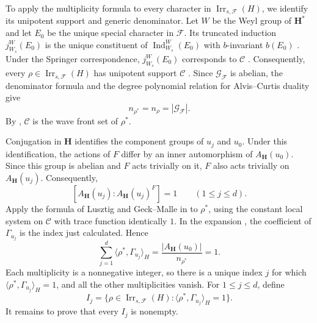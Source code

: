 \documentclass[10pt]{amsart}
\theoremstyle{definition}
\renewcommand{\leq}{\leqslant}
\let\oldendproof\endproof
\renewenvironment{proof}[1][\proofname]{%
  \oldproof[\bfseries #1]%
}{\oldendproof}
\DeclareMathOperator{\Irr}{Irr}
\numberwithin{equation}{section}
\numberwithin{table}{section}
\begin{document}
\begin{proof}[Proof of Lemma~\ref{lem:type-b-isolated-coverage}]
To apply the multiplicity formula to every character in $\Irr_{s,\mathcal F}(H)$,
we identify its unipotent support and generic denominator.
Let $W$ be the Weyl group of $\mathbf H^*$ and let $E_0$ be the unique special
character in $\mathcal F$. Its truncated induction $j_{W_s}^W(E_0)$
is the unique constituent of
$\operatorname{Ind}_{W_s}^W(E_0)$ with $b$-invariant $b(E_0)$
\cite[p.~476]{Taylor2014Maximal}.
Under the Springer correspondence, $j_{W_s}^W(E_0)$ corresponds to
$\mathcal C$ \cite[Section~3(C)]{GeckMalle2000}. Consequently, every
$\rho\in\Irr_{s,\mathcal F}(H)$ has unipotent support $\mathcal C$
\cite[Theorem~3.7]{GeckMalle2000}.
Since $\mathcal G_{\mathcal F}$ is abelian, the denominator formula
\cite[(6.1)(c)]{Geck1999GGGR} and the degree polynomial relation for
Alvis--Curtis duality \cite[Proposition~3.4.21]{GeckMalle2020} give
\[
 n_{\rho^*}=n_\rho=|\mathcal G_{\mathcal F}|.
\]
By \cite[Lemma~14.15]{Taylor2016}, $\mathcal C$ is the wave front set of $\rho^*$.

Conjugation in $\mathbf H$ identifies the component groups of $u_j$ and $u_0$.
Under this identification, the actions of $F$ differ by an inner automorphism
of $A_{\mathbf H}(u_0)$. Since this group is abelian and $F$ acts trivially on it,
$F$ also acts trivially on $A_{\mathbf H}(u_j)$. Consequently,
\[
 [A_{\mathbf H}(u_j):A_{\mathbf H}(u_j)^F]=1
 \qquad(1\leq j\leq d).
\]
Apply the formula of Lusztig and Geck--Malle in \cite[Proposition~15.4]{Taylor2016}
to $\rho^*$, using the constant local system on $\mathcal C$ with trace function
identically $1$. In the expansion \cite[(11.15)]{Taylor2016}, the coefficient
of $\Gamma_{u_j}$ is the index just calculated. Hence
\begin{equation}\label{eq:gggr-family-multiplicity-sum}
 \sum_{j=1}^{d}\langle\rho^*,\Gamma_{u_j}\rangle_H
 =\frac{|A_{\mathbf H}(u_0)|}{n_{\rho^*}}=1.
\end{equation}
Each multiplicity is a nonnegative integer, so there is a unique index $j$
for which $\langle\rho^*,\Gamma_{u_j}\rangle_H=1$, and all the other
multiplicities vanish. For $1\leq j\leq d$, define
\[
 I_j=\{\rho\in\Irr_{s,\mathcal F}(H):
       \langle\rho^*,\Gamma_{u_j}\rangle_H=1\}.
\]
It remains to prove that every $I_j$ is nonempty.


\end{proof}
\end{document}
